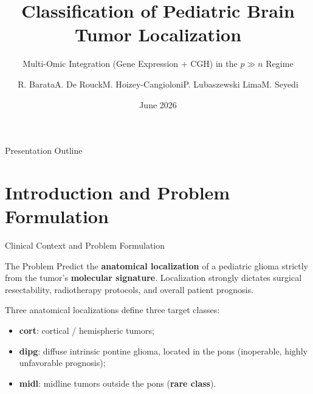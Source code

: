 \documentclass[aspectratio=169, 10pt]{beamer}
\title[Pediatric Brain Tumor Localization]{Classification of Pediatric Brain Tumor Localization}
\subtitle{Multi-Omic Integration (Gene Expression + CGH) in the \texorpdfstring{$p \gg n$}{p >> n} Regime}
\author[]{R. Barata\texorpdfstring{\quad}{ }A. De Rouck\texorpdfstring{\quad}{ }M. Hoizey-Cangioloni\texorpdfstring{\quad}{ }P. Lubaszewski Lima\texorpdfstring{\quad}{ }M. Seyedi}
\institute[CentraleSupélec]{CentraleSupélec \\ \small Advisor: Arthur Tenenhaus}
\date[June 2026]{June 2026}
\begin{document}
\begin{frame}[plain]
  \titlepage
\end{frame}

\begin{frame}{Presentation Outline}
  \tableofcontents
\end{frame}

\section{Introduction and Problem Formulation}

\begin{frame}{Clinical Context and Problem Formulation}
  \begin{block}{The Problem}
    Predict the \textbf{anatomical localization} of a pediatric glioma strictly from the tumor's \textbf{molecular signature}.
    Localization strongly dictates surgical resectability, radiotherapy protocols, and overall patient prognosis.
  \end{block}

  \bigskip
  Three anatomical localizations define three target classes:
  \begin{itemize}
    \item \textbf{cort}: cortical / hemispheric tumors;
    \item \textbf{dipg}: diffuse intrinsic pontine glioma, located in the pons (inoperable, highly unfavorable prognosis);
    \item \textbf{midl}: midline tumors outside the pons (\textbf{rare class}).
  \end{itemize}
\end{frame}
\end{document}
